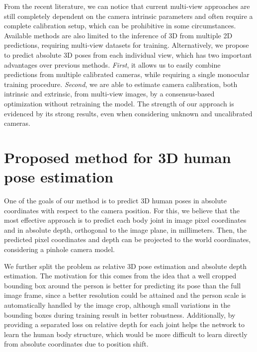 \documentclass[10pt,twocolumn,letterpaper]{article}
\newcommand{\rev}[1]{#1}
\newcommand{\revb}[1]{{#1}}
\begin{document}
From the recent literature, we can notice that current multi-view approaches
are still completely dependent on the camera intrinsic parameters and often
require a complete calibration setup, which can be prohibitive in some
circumstances. Available methods are also limited to the inference of 3D from
multiple 2D predictions, requiring multi-view datasets for training.
Alternatively, we propose to predict absolute 3D poses from each individual
view, which has two important advantages over previous methods. \textit{First}, it
allows us to easily combine predictions from multiple calibrated cameras, while
requiring a single monocular training procedure. \textit{Second}, we are able to
estimate camera calibration, both intrinsic and extrinsic, from multi-view
images, by a consensus-based optimization without retraining the model.  The
strength of our approach is evidenced by its strong results, even when
considering unknown and uncalibrated cameras.










\section{Proposed method for 3D human pose estimation}
\label{sec:method-3dpose}


One of the goals of our method is to predict 3D human poses in absolute coordinates
with respect to the camera position.  For this, we believe that the most
effective approach is to predict each body joint in image pixel coordinates and
in absolute depth, orthogonal to the image plane, in millimeters. Then, the
predicted
pixel coordinates and depth can be projected to the world coordinates, considering a
pinhole camera model.

We further split the problem as relative 3D pose estimation and absolute depth
estimation. The motivation for this comes from the idea that a well cropped
bounding box around the person is better for predicting its pose than the full
image frame, since a better resolution could be attained and the person scale
is automatically handled by the image crop, \revb{although small variations in the bounding boxes during training result in better robustness}. \rev{Additionally, by providing a
separated loss on relative depth for each joint helps the network to learn
the human body structure, which would be more difficult to learn directly from
absolute coordinates due to position shift.
}
\end{document}

